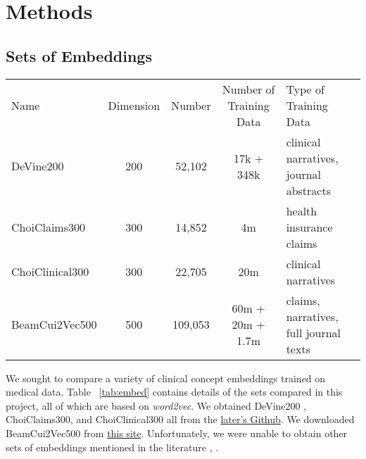\documentclass[11pt,a4paper]{article}
\begin{document}
\section{Methods}

\subsection{Sets of Embeddings}

\begin{table*}[h!]
	
	\begin{center}
		\begin{tabular}{lcccl} %
			Name & Dimension & Number & Number of Training Data& Type of Training Data \\
			\hlineB{4}
			DeVine200 & 200 & 52,102 & 17k + 348k &clinical narratives, journal abstracts\\
			\hline
			ChoiClaims300 & 300 & 14,852& 4m&health insurance claims\\
			\hline
			ChoiClinical300 & 300 & 22,705&20m& clinical narratives\\
			\hline
			BeamCui2Vec500 & 500 & 109,053&60m + 20m + 1.7m& claims, narratives, full journal texts\\
		\end{tabular}
	\end{center}
	\caption{Characteristics of the embeddings compared, including the name referred, the embedding dimensions, the number of embeddings in the dataset, and the type of data used to train them.}
	\label{tab:embed}
\end{table*}

We sought to compare a variety of clinical concept embeddings trained on medical data. Table ~\ref{tab:embed} contains details of the sets compared in this project, all of which are based on \emph{word2vec}. We obtained DeVine200 \cite{devineMedicalSemanticSimilarity2014}, ChoiClaims300, and ChoiClinical300 \cite{choiLearningLowDimensionalRepresentations2016} all from the \href{https://github.com/clinicalml/embeddings}{later's Github}. We downloaded BeamCui2Vec500 \cite{beamClinicalConceptEmbeddings2018} from \href{https://figshare.com/s/00d69861786cd0156d81}{this site}. Unfortunately, we were unable to obtain other sets of embeddings mentioned in the literature \cite{minarro-gimenezExploringApplicationDeep2014}, \cite{zhangAdaptingWordEmbeddings2018} \cite{xiangTimesensitiveClinicalConcept2019}.
\end{document}

